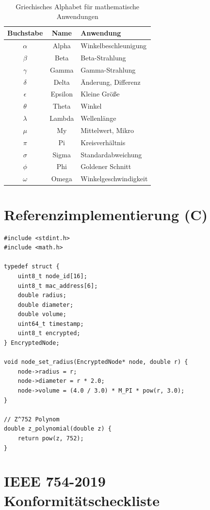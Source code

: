 \documentclass[12pt]{book}
\begin{document}
\begin{table}[h]
\centering
\begin{tabular}{|c|c|l|}
\hline
\textbf{Buchstabe} & \textbf{Name} & \textbf{Anwendung} \\
\hline
$\alpha$ & Alpha & Winkelbeschleunigung \\
\hline
$\beta$ & Beta & Beta-Strahlung \\
\hline
$\gamma$ & Gamma & Gamma-Strahlung \\
\hline
$\delta$ & Delta & Änderung, Differenz \\
\hline
$\epsilon$ & Epsilon & Kleine Größe \\
\hline
$\theta$ & Theta & Winkel \\
\hline
$\lambda$ & Lambda & Wellenlänge \\
\hline
$\mu$ & My & Mittelwert, Mikro \\
\hline
$\pi$ & Pi & Kreisverhältnis \\
\hline
$\sigma$ & Sigma & Standardabweichung \\
\hline
$\phi$ & Phi & Goldener Schnitt \\
\hline
$\omega$ & Omega & Winkelgeschwindigkeit \\
\hline
\end{tabular}
\caption{Griechisches Alphabet für mathematische Anwendungen}
\end{table}

\appendix

\chapter{Referenzimplementierung (C)}

\begin{verbatim}
#include <stdint.h>
#include <math.h>

typedef struct {
    uint8_t node_id[16];
    uint8_t mac_address[6];
    double radius;
    double diameter;
    double volume;
    uint64_t timestamp;
    uint8_t encrypted;
} EncryptedNode;

void node_set_radius(EncryptedNode* node, double r) {
    node->radius = r;
    node->diameter = r * 2.0;
    node->volume = (4.0 / 3.0) * M_PI * pow(r, 3.0);
}

// Z^752 Polynom
double z_polynomial(double z) {
    return pow(z, 752);
}
\end{verbatim}

\chapter{IEEE 754-2019 Konformitätscheckliste}
\end{document}
